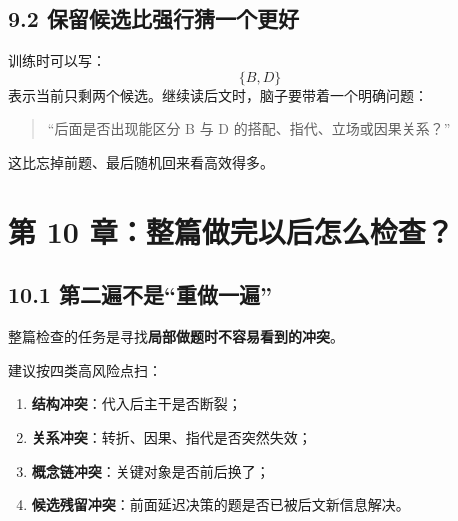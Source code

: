 \documentclass[11pt,a4paper]{ctexart}
\newcommand{\kw}[1]{\textbf{#1}}
\begin{document}
\subsection{9.2 保留候选比强行猜一个更好}
训练时可以写：
\[
\{B,D\}
\]
表示当前只剩两个候选。继续读后文时，脑子要带着一个明确问题：
\begin{quote}
“后面是否出现能区分 B 与 D 的搭配、指代、立场或因果关系？”
\end{quote}
这比忘掉前题、最后随机回来看高效得多。

\section{第 10 章：整篇做完以后怎么检查？}

\subsection{10.1 第二遍不是“重做一遍”}
整篇检查的任务是寻找\kw{局部做题时不容易看到的冲突}。

建议按四类高风险点扫：
\begin{enumerate}
  \item \kw{结构冲突}：代入后主干是否断裂；
  \item \kw{关系冲突}：转折、因果、指代是否突然失效；
  \item \kw{概念链冲突}：关键对象是否前后换了；
  \item \kw{候选残留冲突}：前面延迟决策的题是否已被后文新信息解决。
\end{enumerate}
\end{document}
